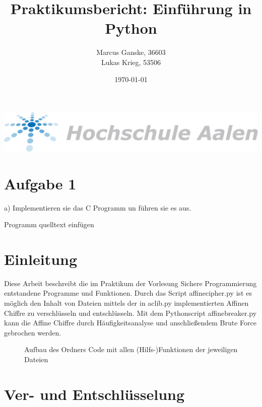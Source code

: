 \documentclass[12pt]{article}
\title{Praktikumsbericht: Einf\"uhrung in Python}
\author{Marcus Ganske, 36603\\
		Lukas Krieg, 53506}
\date{\today}
\begin{document}
\maketitle
\vspace{+8cm}{
}
\includegraphics[width=15cm]{Hochschule-aalen.pdf}

\newpage
\renewcommand\contentsname{Inhaltsverzeichnis}
\tableofcontents
\newpage


\section{Aufgabe 1}
a) Implementieren sie das C Programm un führen sie es aus.

Programm quelltext einfügen


	
	\section{Einleitung}
		Diese Arbeit beschreibt die im Praktikum der Vorlesung Sichere Programmierung  entstandene Programme und Funktionen. Durch das Script affinecipher.py ist es möglich den Inhalt von Dateien mittels der in aclib.py implementierten Affinen Chiffre zu verschlüsseln und entschlüsseln. Mit dem Pythonscript affinebreaker.py kann die Affine Chiffre durch H\"aufigkeitsanalyse und anschlie{\ss}endem Brute Force gebrochen werden.
		\begin{figure}[H]
		\caption{Aufbau des Ordners Code mit allen (Hilfs-)Funktionen der jeweiligen Dateien}
	\end{figure}
		
	\section{Ver- und Entschl\"usselung}
\end{document}
